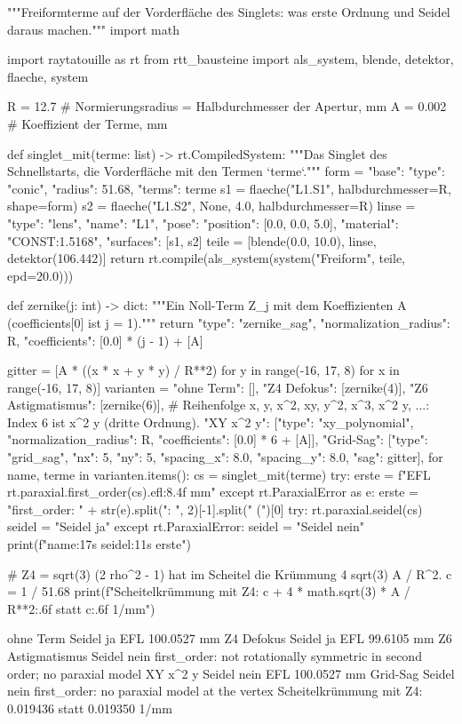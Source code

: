 \documentclass[11pt,a4paper,openany]{book}
\DeclareRobustCommand{\code}[1]{\texttt{\directlua{rttcode("\luaescapestring{\detokenize{#1}}")}}}
\begin{document}
\begin{pycode}[title={\code{ex25_freiform.py}}]
"""Freiformterme auf der Vorderfläche des Singlets: was erste Ordnung und Seidel daraus machen."""
import math

import raytatouille as rt
from rtt_bausteine import als_system, blende, detektor, flaeche, system

R = 12.7    # Normierungsradius = Halbdurchmesser der Apertur, mm
A = 0.002   # Koeffizient der Terme, mm


def singlet_mit(terme: list) -> rt.CompiledSystem:
    """Das Singlet des Schnellstarts, die Vorderfläche mit den Termen `terme`."""
    form = {"base": {"type": "conic", "radius": 51.68}, "terms": terme}
    s1 = flaeche("L1.S1", halbdurchmesser=R, shape=form)
    s2 = flaeche("L1.S2", None, 4.0, halbdurchmesser=R)
    linse = {"type": "lens", "name": "L1", "pose": {"position": [0.0, 0.0, 5.0]},
             "material": "CONST:1.5168", "surfaces": [s1, s2]}
    teile = [blende(0.0, 10.0), linse, detektor(106.442)]
    return rt.compile(als_system(system("Freiform", teile, epd=20.0)))


def zernike(j: int) -> dict:
    """Ein Noll-Term Z_j mit dem Koeffizienten A (coefficients[0] ist j = 1)."""
    return {"type": "zernike_sag", "normalization_radius": R,
            "coefficients": [0.0] * (j - 1) + [A]}


gitter = [A * ((x * x + y * y) / R**2) for y in range(-16, 17, 8) for x in range(-16, 17, 8)]
varianten = {
    "ohne Term": [],
    "Z4 Defokus": [zernike(4)],
    "Z6 Astigmatismus": [zernike(6)],
    # Reihenfolge x, y, x^2, xy, y^2, x^3, x^2 y, ...: Index 6 ist x^2 y (dritte Ordnung).
    "XY x^2 y": [{"type": "xy_polynomial", "normalization_radius": R,
                  "coefficients": [0.0] * 6 + [A]}],
    "Grid-Sag": [{"type": "grid_sag", "nx": 5, "ny": 5, "spacing_x": 8.0, "spacing_y": 8.0,
                  "sag": gitter}],
}
for name, terme in varianten.items():
    cs = singlet_mit(terme)
    try:
        erste = f"EFL {rt.paraxial.first_order(cs).efl:8.4f} mm"
    except rt.ParaxialError as e:
        erste = "first_order: " + str(e).split(": ", 2)[-1].split(" (")[0]
    try:
        rt.paraxial.seidel(cs)
        seidel = "Seidel ja"
    except rt.ParaxialError:
        seidel = "Seidel nein"
    print(f"{name:17s} {seidel:11s} {erste}")

# Z4 = sqrt(3) (2 rho^2 - 1) hat im Scheitel die Krümmung 4 sqrt(3) A / R^2.
c = 1 / 51.68
print(f"Scheitelkrümmung mit Z4: {c + 4 * math.sqrt(3) * A / R**2:.6f} statt {c:.6f} 1/mm")
\end{pycode}
\begin{ausgabe}
ohne Term         Seidel ja   EFL 100.0527 mm
Z4 Defokus        Seidel ja   EFL  99.6105 mm
Z6 Astigmatismus  Seidel nein first_order: not rotationally symmetric in second order; no paraxial model
XY x^2 y          Seidel nein EFL 100.0527 mm
Grid-Sag          Seidel nein first_order: no paraxial model at the vertex
Scheitelkrümmung mit Z4: 0.019436 statt 0.019350 1/mm
\end{ausgabe}
\end{document}
